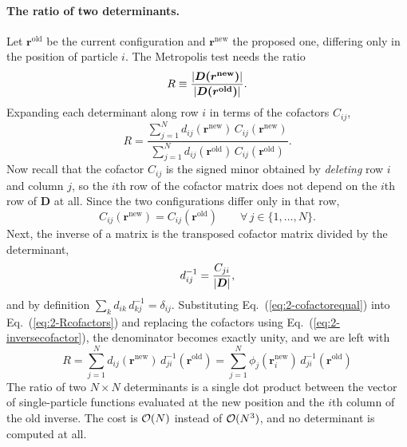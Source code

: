 \paragraph{The ratio of two determinants.}
Let $\bm{r}^{\mathrm{old}}$ be the current configuration and
$\bm{r}^{\mathrm{new}}$ the proposed one, differing only in the position of
particle $i$.  The Metropolis test needs the ratio
\begin{equation}
  R \equiv \frac{{|\boldsymbol{D(\bm{r}^{\mathrm{new}})}|}}
                {{|\boldsymbol{D(\bm{r}^{\mathrm{old}})}|}} .
  \label{eq:2-Rdefinition}
\end{equation}
Expanding each determinant along row $i$ in terms of the cofactors $C_{ij}$,
\begin{equation}
  R = \frac{\sum_{j=1}^{N} d_{ij}(\bm{r}^{\mathrm{new}})\,
            C_{ij}(\bm{r}^{\mathrm{new}})}
           {\sum_{j=1}^{N} d_{ij}(\bm{r}^{\mathrm{old}})\,
            C_{ij}(\bm{r}^{\mathrm{old}})} .
  \label{eq:2-Rcofactors}
\end{equation}
Now recall that the cofactor $C_{ij}$ is the signed minor obtained by
\emph{deleting} row $i$ and column $j$, so the $i$th row of the cofactor
matrix does not depend on the $i$th row of $\bm{D}$ at all.  Since the two
configurations differ only in that row,
\begin{equation}
  C_{ij}(\bm{r}^{\mathrm{new}}) = C_{ij}(\bm{r}^{\mathrm{old}})
  \qquad \forall\, j\in\{1,\dots,N\} .
  \label{eq:2-cofactorequal}
\end{equation}
Next, the inverse of a matrix is the transposed cofactor matrix divided by the
determinant,
\begin{equation}
  d^{-1}_{ij} = \frac{C_{ji}}{{|\boldsymbol{D}|}} ,
  \label{eq:2-inversecofactor}
\end{equation}
and by definition $\sum_{k} d_{ik}\,d^{-1}_{kj} = \delta_{ij}$.  Substituting
Eq.~(\ref{eq:2-cofactorequal}) into Eq.~(\ref{eq:2-Rcofactors}) and replacing
the cofactors using Eq.~(\ref{eq:2-inversecofactor}), the denominator becomes
exactly unity, and we are left with
\begin{equation}
  \boxed{\;
  R = \sum_{j=1}^{N} d_{ij}(\bm{r}^{\mathrm{new}})\,
      d^{-1}_{ji}(\bm{r}^{\mathrm{old}})
    = \sum_{j=1}^{N} \phi_j(\bm{r}_i^{\mathrm{new}})\,
      d^{-1}_{ji}(\bm{r}^{\mathrm{old}}) \;}
  \label{eq:2-Rinverse}
\end{equation}
The ratio of two $N\times N$ determinants is a single dot product between the
vector of single-particle functions evaluated at the new position and the
$i$th column of the old inverse.  The cost is $\mathcal{O}(N)$ instead of
$\mathcal{O}(N^3)$, and no determinant is computed at all.

